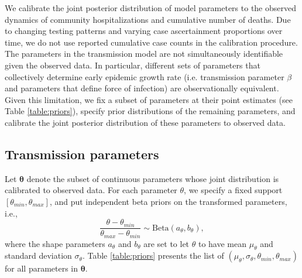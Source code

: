 \documentclass[11pt]{article}
\newcommand{\btheta}{\boldsymbol{\theta}}
\newcommand{\comments}[1]{[\textcolor{red}{#1}]}
\begin{document}
%

We calibrate the joint posterior distribution of model parameters to the observed dynamics of community hospitalizations and cumulative number of deaths. 
Due to changing testing patterns and varying case ascertainment proportions over time, we do not use reported cumulative case counts in the calibration procedure.  
The parameters in the transmission model are not simultaneously identifiable given the observed data. In particular, different sets of parameters that collectively determine early epidemic growth rate (i.e. transmission parameter $\beta$ and parameters that define force of infection) are observationally equivalent. Given this limitation, we fix a subset of parameters at their point estimates (see Table \ref{table:priors}), specify prior distributions of the remaining parameters, and calibrate the joint posterior distribution of these parameters to observed data. 

\subsection{Transmission parameters} 

Let $\btheta$ denote the subset of continuous parameters whose joint distribution is calibrated to observed data. For each parameter $\theta$, we specify a fixed support $[\theta_{min}, \theta_{max}]$, and put independent beta priors on the transformed parameters, i.e.,
\begin{equation}
\frac{\theta - \theta_{min}}{\theta_{max} - \theta_{min}} \sim \mbox{Beta}(a_{\theta}, b_{\theta}),
\label{eq:truncdist}
\end{equation}    
where the shape parameters $a_{\theta}$ and $b_\theta$ are set to let $\theta$ to have mean $\mu_\theta$ and standard deviation $\sigma_\theta$. Table \ref{table:priors} presents the list of $(\mu_\theta, \sigma_\theta, \theta_{min}, \theta_{max})$ for all parameters in $\btheta$. 
\end{document}
